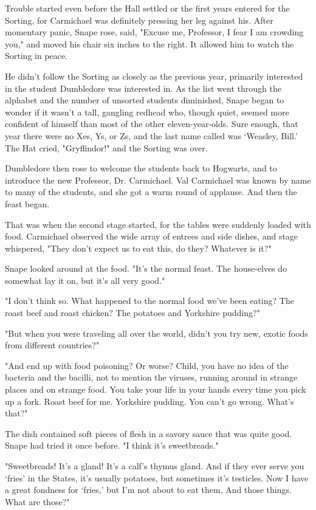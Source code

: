 Trouble started even before the Hall settled or the first years entered for the Sorting, for Carmichael was definitely pressing her leg against his. After momentary panic, Snape rose, said, "Excuse me, Professor, I fear I am crowding you," and moved his chair six inches to the right. It allowed him to watch the Sorting in peace.

He didn't follow the Sorting as closely as the previous year, primarily interested in the student Dumbledore was interested in. As the list went through the alphabet and the number of unsorted students diminished, Snape began to wonder if it wasn't a tall, gangling redhead who, though quiet, seemed more confident of himself than most of the other eleven-year-olds. Sure enough, that year there were no Xes, Ys, or Zs, and the last name called was `Weasley, Bill.' The Hat cried, "Gryffindor!" and the Sorting was over.

Dumbledore then rose to welcome the students back to Hogwarts, and to introduce the new Professor, Dr. Carmichael. Val Carmichael was known by name to many of the students, and she got a warm round of applause. And then the feast began.

That was when the second stage started, for the tables were suddenly loaded with food. Carmichael observed the wide array of entrees and side dishes, and stage whispered, "They don't expect us to eat this, do they? Whatever is it?"

Snape looked around at the food. "It's the normal feast. The house-elves do somewhat lay it on, but it's all very good."

"I don't think so. What happened to the normal food we've been eating? The roast beef and roast chicken? The potatoes and Yorkshire pudding?"

"But when you were traveling all over the world, didn't you try new, exotic foods from different countries?"

"And end up with food poisoning? Or worse? Child, you have no idea of the bacteria and the bacilli, not to mention the viruses, running around in strange places and on strange food. You take your life in your hands every time you pick up a fork. Roast beef for me. Yorkshire pudding. You can't go wrong. What's that?"

The dish contained soft pieces of flesh in a savory sauce that was quite good. Snape had tried it once before. "I think it's sweetbreads."

"Sweetbreads! It's a gland! It's a calf's thymus gland. And if they ever serve you `fries' in the States, it's usually potatoes, but sometimes it's testicles. Now I have a great fondness for `fries,' but I'm not about to eat them. And those things. What are those?"

